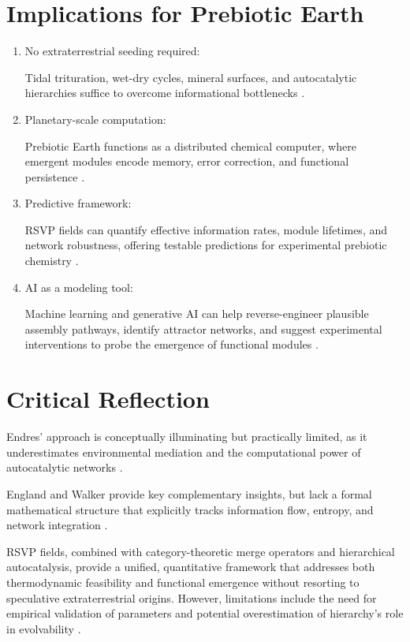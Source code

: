 \documentclass[openany]{book}
\begin{document}
\section{Implications for Prebiotic Earth}
\begin{enumerate}
\item No extraterrestrial seeding required:

Tidal trituration, wet-dry cycles, mineral surfaces, and autocatalytic hierarchies suffice to overcome informational bottlenecks \citep{plum2025}.
\item Planetary-scale computation:

Prebiotic Earth functions as a distributed chemical computer, where emergent modules encode memory, error correction, and functional persistence \citep{peng2020}.
\item Predictive framework:

RSVP fields can quantify effective information rates, module lifetimes, and network robustness, offering testable predictions for experimental prebiotic chemistry \citep{sokolskyi2024}.
\item AI as a modeling tool:

Machine learning and generative AI can help reverse-engineer plausible assembly pathways, identify attractor networks, and suggest experimental interventions to probe the emergence of functional modules \citep{scalinghypothesis}.
\end{enumerate}

\section{Critical Reflection}
Endres’ approach is conceptually illuminating but practically limited, as it underestimates environmental mediation and the computational power of autocatalytic networks \citep{endres2025}.

England and Walker provide key complementary insights, but lack a formal mathematical structure that explicitly tracks information flow, entropy, and network integration \citep{england2015, walker2017}.

RSVP fields, combined with category-theoretic merge operators and hierarchical autocatalysis, provide a unified, quantitative framework that addresses both thermodynamic feasibility and functional emergence without resorting to speculative extraterrestrial origins. However, limitations include the need for empirical validation of parameters and potential overestimation of hierarchy's role in evolvability \citep{vasas2010}.
\end{document}
